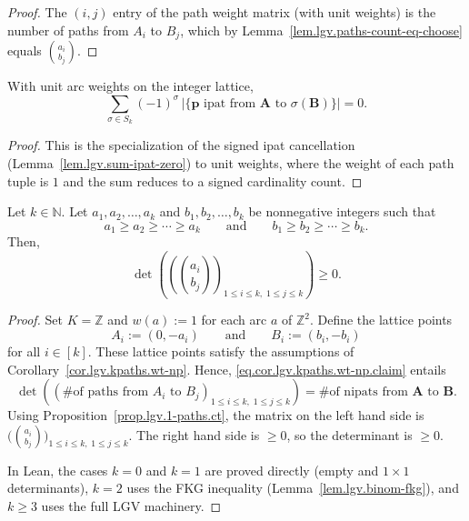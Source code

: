 \begin{proof}
\leanok
The $(i,j)$ entry of the path weight matrix (with unit weights) is
the number of paths from $A_i$ to $B_j$, which by
Lemma~\ref{lem.lgv.paths-count-eq-choose} equals $\binom{a_i}{b_j}$.
\end{proof}

\begin{lemma}
\label{lem.lgv.sum-signed-ipat-card-zero}
\leanhelper
\leanok
With unit arc weights on the integer lattice,
\[
  \sum_{\sigma \in S_k} (-1)^\sigma \,
  \bigl|\{\mathbf{p} \text{ ipat from } \mathbf{A} \text{ to } \sigma(\mathbf{B})\}\bigr| = 0.
\]
\end{lemma}

\begin{proof}
This is the specialization of the signed ipat cancellation
(Lemma~\ref{lem.lgv.sum-ipat-zero}) to unit weights, where the weight of
each path tuple is $1$ and the sum reduces to a signed cardinality count.
\end{proof}

\begin{corollary}
\label{cor.lgv.binom-det-nonneg}
\leantarget
\leanok
Let $k \in \mathbb{N}$.  Let $a_1, a_2, \ldots, a_k$ and
$b_1, b_2, \ldots, b_k$ be nonnegative integers such that
\[
  a_1 \ge a_2 \ge \cdots \ge a_k
  \qquad \text{and} \qquad
  b_1 \ge b_2 \ge \cdots \ge b_k.
\]
Then,
\[
  \det\!\left(\left(\binom{a_i}{b_j}\right)_{1 \le i \le k,\; 1 \le j \le k}\right) \ge 0.
\]
\end{corollary}

\begin{proof}
Set $K = \mathbb{Z}$ and $w(a) := 1$ for each arc $a$ of $\mathbb{Z}^2$.
Define the lattice points
\[
  A_i := (0, -a_i) \qquad \text{and} \qquad B_i := (b_i, -b_i)
\]
for all $i \in [k]$.  These lattice points satisfy the assumptions
of Corollary~\ref{cor.lgv.kpaths.wt-np}.  Hence,
\eqref{eq.cor.lgv.kpaths.wt-np.claim} entails
\[
  \det\!\left(\left(\text{\# of paths from } A_i \text{ to } B_j\right)_{1 \le i \le k,\; 1 \le j \le k}\right)
  = \text{\# of nipats from } \mathbf{A} \text{ to } \mathbf{B}.
\]
Using Proposition~\ref{prop.lgv.1-paths.ct}, the matrix on the left
hand side is
$\bigl(\binom{a_i}{b_j}\bigr)_{1 \le i \le k,\; 1 \le j \le k}$.
The right hand side is $\ge 0$, so the determinant is $\ge 0$.

In Lean, the cases $k = 0$ and $k = 1$ are proved directly (empty and
$1\times 1$ determinants), $k = 2$ uses the FKG inequality
(Lemma~\ref{lem.lgv.binom-fkg}), and $k \ge 3$ uses the full LGV
machinery.
\end{proof}

